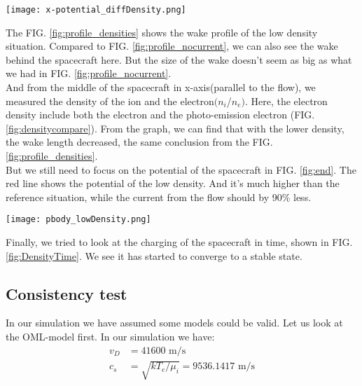 \documentclass[aip, 
rsi, 
amsmath,
amssymb,
longbibliography,
reprint]{revtex4-1}
\begin{document}
\begin{figure*}
\texttt{[image: x-potential\_diffDensity.png]}
\caption{The potential near the spacecraft along X for different densities. \label{fig:end}}
\end{figure*}

The FIG. \ref{fig:profile_densities} shows the wake profile of the low density situation. Compared to FIG. \ref{fig:profile_nocurrent}, we can also see the wake behind the spacecraft here. But the size of the wake doesn't seem as big as what we had in FIG. \ref{fig:profile_nocurrent}.\\

And from the middle of the spacecraft in x-axis(parallel to the flow), we measured the density of the ion and the electron$(n_i$/$n_e)$. Here, the electron density include both the electron and the photo-emission electron (FIG. \ref{fig:densitycompare}). From the graph, we can find that with the lower density, the wake length decreased, the same conclusion from the FIG. \ref{fig:profile_densities}.\\

But we still need to focus on the potential of the spacecraft in FIG. \ref{fig:end}. The red line shows the potential of the low density. And it's much higher than the reference situation, while the current from the flow should by 90\% less.\\

\begin{figure*}
\texttt{[image: pbody\_lowDensity.png]}
\caption{the change in the spacecraft potential over time.\label{fig:DensityTime}}
\end{figure*}

Finally, we tried to look at the charging of the spacecraft in time, shown in FIG. \ref{fig:DensityTime}. We see it has started to converge to a stable state.

\subsection{Consistency test}

In our simulation we have assumed some models could be valid. Let us look at the OML-model first. In our simulation we have:
\begin{align*}
v_D &= 41600 \, \, \text{m/s}\\
c_s &= \sqrt{k T_e / \mu_i} = 9536.1417 \, \, \text{m/s}
\end{align*}
\end{document}
